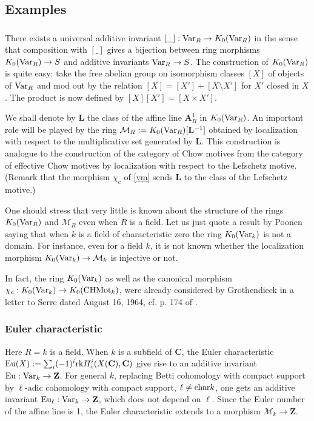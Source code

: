 \documentclass[english,12pt]{amsart}
\def\AA{{\mathbf A}}
\def\CC{{\mathbf C}}
\def\LL{{\mathbf L}}
\def\ZZ{{\mathbf Z}}
\def\cM{{\mathcal M}}
\theoremstyle{definition}
\theoremstyle{remark}
\theoremstyle{plain}
\numberwithin{equation}{subsection}
\def\AA{{\mathbf A}}
\def\CC{{\mathbf C}}
\def\LL{{\mathbf L}}
\def\ZZ{{\mathbf Z}}
\def\cM{{\mathcal M}}
\begin{document}
\subsection{Examples}


\subsubsection{}There exists a universal
additive invariant
$[\_] : {\rm Var}_R \rightarrow K_0 ({\rm Var}_R)$ 
in the sense that 
composition with $[\_] $ gives a bijection between
ring morphisms $ K_0 ({\rm Var}_R) \rightarrow S$
and 
additive invariants ${\rm Var}_R \rightarrow S$.
The construction of $K_0 ({\rm Var}_R)$ is quite easy:
take the
free abelian group on isomorphism classes $[X]$
of objects of ${\rm Var}_R$ and mod out by the relation
$[X] = [X'] + [X \setminus X']$ for $X'$ closed in $X$.
The product is now defined by $[X] [X'] = [X \times X']$.




We shall denote by $\LL$ the class of the affine line $\AA^1_R$ in
$K_0 ({\rm Var}_R)$. An important role will be played by
the ring 
$\cM_R := K_0 ({\rm Var}_R)[\LL^{- 1}]$ obtained by localization with respect to the 
multiplicative set generated by $\LL$.
This construction is analogue to the construction
of the category of Chow motives from the category of effective
Chow motives by localization with respect to the Lefschetz motive.
(Remark that the morphism $\chi_c$
of \ref{vm} sends $\LL$ to the class of the Lefschetz motive.)






One should stress that very little is known about the structure
of the rings $K_0 ({\rm Var}_R)$ and $\cM_R$ even when $R$ is a field.
Let us just
quote a result by Poonen \cite{poonen}
saying that 
when $k$ is a field of characteristic zero the ring
$K_0 ({\rm Var}_k)$ is not a domain. For instance, even for a field $k$, it is not known whether
the localization morphism
 $K_0 ({\rm Var}_k) \rightarrow \cM_k$ is injective or not.

\remark In fact, the ring 
$K_0 ({\rm Var}_k)$
as well as the canonical morphism
$\chi_c : K_0 ({\rm Var}_k) \rightarrow
K_0 ({\rm CHMot}_k)$,
were already considered by Grothendieck in a letter to Serre dated
August 16, 1964, cf. p. 174 of \cite{gs}.



\subsubsection{Euler characteristic}Here $R = k$ is a field. When $k$ is a subfield
of $\CC$, the Euler characteristic
${\rm Eu} (X) := \sum_i (-1)^i {\rm rk} H^i_c (X (\CC), \CC)$
give rise to an additive invariant
${\rm Eu} : {\rm Var}_k \rightarrow \ZZ$. For general $k$, replacing
Betti cohomology with compact support
by $\ell$-adic cohomology with compact support,
$\ell \not= {\rm char} k$, one gets  an additive invariant
${\rm Eu}_{\ell} : {\rm Var}_k \rightarrow \ZZ$, which does not
depend on $\ell$.
Since the Euler number of the affine line is 1, 
the Euler characteristic extends to a morphism $\cM_k \rightarrow \ZZ$.
\end{document}
